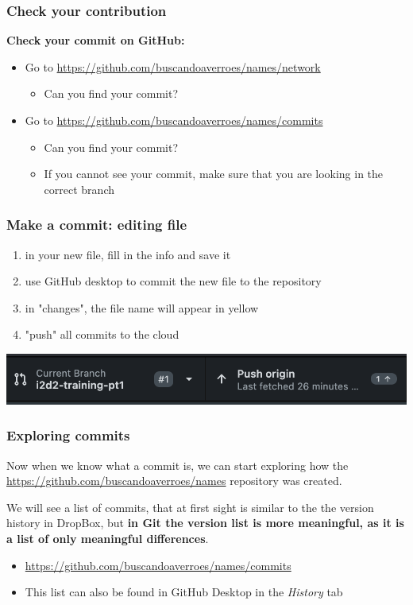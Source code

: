 \documentclass[aspectratio=169]{beamer} %
\newcommand{\trainingURL}[1]{{\color{blue}\url{#1}}}
\newcommand{\traininerUsername}{buscandoaverroes}
\newcommand{\repoName}{\traininerUsername/names}
\newcommand{\trainingRepoURL}[1]{\trainingURL{https://github.com/\repoName #1}}
\begin{document}
\begin{frame}
\frametitle{Check your contribution}

	\textbf{Check your commit on GitHub:}
	\begin{itemize}
		\item Go to \trainingRepoURL{/network}
		\begin{itemize}
			\item Can you find your commit?
		\end{itemize}
		\item Go to \trainingRepoURL{/commits}
		\begin{itemize}
			\item Can you find your commit?
			\item If you cannot see your commit, make sure that you are looking in the correct branch
		\end{itemize}
	\end{itemize}

\end{frame}



\begin{frame}
\frametitle{Make a commit: editing file}


	\begin{enumerate}
		\item in your new file, fill in the info and save it
		\item use GitHub desktop to commit the new file to the repository
		\item in "changes", the file name will appear in yellow
		\item "push" all commits to the cloud
	\end{enumerate}

\includegraphics[width=1\linewidth]{img/desktop_push}


\end{frame}


\begin{frame}
\frametitle{Exploring commits}

	Now when we know what a commit is, we can start exploring how the \trainingRepoURL{} repository was created.

	\vspace{.25cm}

	We will see a list of commits, that at first sight is similar to the the version history in DropBox, but \textbf{in Git the version list is more meaningful, as it is a list of only meaningful differences}.

	\vspace{.25cm}

	\begin{itemize}
		\item \trainingRepoURL{/commits}
		\item This list can also be found in GitHub Desktop in the \textit{History} tab
	\end{itemize}

\end{frame}
\end{document}
